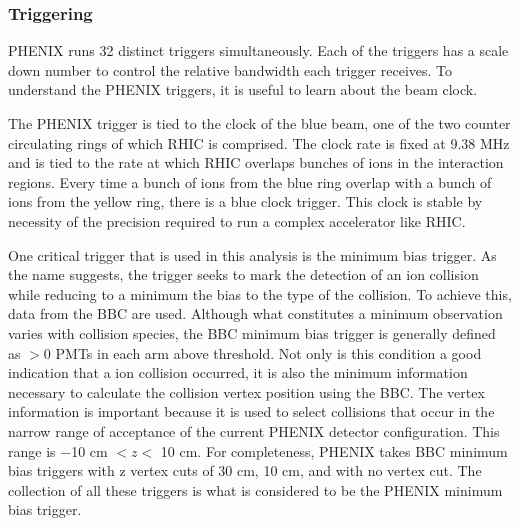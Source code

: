 \subsubsection{Triggering}
PHENIX runs 32 distinct triggers simultaneously. Each of the triggers has a scale down number to control the relative bandwidth each trigger receives. To understand the PHENIX triggers, it is useful to learn about the beam clock.

The PHENIX trigger is tied to the clock of the blue beam, one of the two counter circulating rings of which RHIC is comprised. The clock rate is fixed at 9.38 MHz and is tied to the rate at which RHIC overlaps bunches of ions in the interaction regions. Every time a bunch of ions from the blue ring overlap with a bunch of ions from the yellow ring, there is a blue clock trigger. This clock is stable by necessity of the precision required to run a complex accelerator like RHIC.

One critical trigger that is used in this analysis is the minimum bias trigger. As the name suggests, the trigger seeks to mark the detection of an ion collision while reducing to a minimum the bias to the type of the collision. To achieve this, data from the BBC are used. Although what constitutes a minimum observation varies with collision species, the BBC minimum bias trigger is generally defined as $>$0 PMTs in each arm above threshold. Not only is this condition a good indication that a ion collision occurred, it is also the minimum information necessary to calculate the collision vertex position using the BBC. The vertex information is important because it is used to select collisions that occur in the narrow range of acceptance of the current PHENIX detector configuration. This range is $-$10 cm $< z<$ 10 cm. For completeness, PHENIX takes BBC minimum bias triggers with z vertex cuts of 30 cm, 10 cm, and with no vertex cut. The collection of all these triggers is what is considered to be the PHENIX minimum bias trigger.

